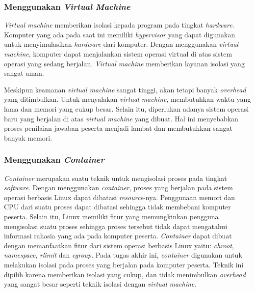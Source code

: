 \subsubsection{Menggunakan \textit{Virtual Machine}}

\par \textit{Virtual machine} memberikan isolasi kepada program pada tingkat \textit{hardware}. Komputer yang ada pada saat ini memiliki \textit{hypervisor} yang dapat digunakan untuk menyimulasikan \textit{hardware} dari komputer. Dengan menggunakan \textit{virtual machine}, komputer dapat menjalankan sistem operasi virtual di atas sistem operasi yang sedang berjalan. \textit{Virtual machine} memberikan layanan isolasi yang sangat aman.

\par Meskipun keamanan \textit{virtual machine} sangat tinggi, akan tetapi banyak \textit{overhead} yang ditimbulkan. Untuk menyalakan \textit{virtual machine}, membutuhkan waktu yang lama dan memori yang cukup besar. Selain itu, diperlukan adanya sistem operasi baru yang berjalan di atas \textit{virtual machine} yang dibuat. Hal ini menyebabkan proses penilaian jawaban peserta menjadi lambat dan membutuhkan sangat banyak memori.

\subsubsection{Menggunakan \textit{Container}}

\par \textit{Container} merupakan suatu teknik untuk mengisolasi proses pada tingkat \textit{software}. Dengan menggunakan \textit{container}, proses yang berjalan pada sistem operasi berbasis Linux dapat dibatasi \textit{resource}-nya. Penggunaan memori dan CPU dari suatu proses dapat dibatasi sehingga tidak membebani komputer peserta. Selain itu, Linux memiliki fitur yang memungkinkan pengguna mengisolasi suatu proses sehingga proses tersebut tidak dapat mengatahui informasi rahasia yang ada pada komputer peserta. \textit{Container} dapat dibuat dengan memanfaatkan fitur dari sistem operasi berbasis Linux yaitu: \textit{chroot}, \textit{namespace}, \textit{rlimit} dan \textit{cgroup}. Pada tugas akhir ini, \textit{container} digunakan untuk melakukan isolasi pada proses yang berjalan pada komputer peserta. Teknik ini dipilih karena memberikan isolasi yang cukup, dan tidak menimbulkan \textit{overhead} yang sangat besar seperti teknik isolasi dengan \textit{virtual machine}.

